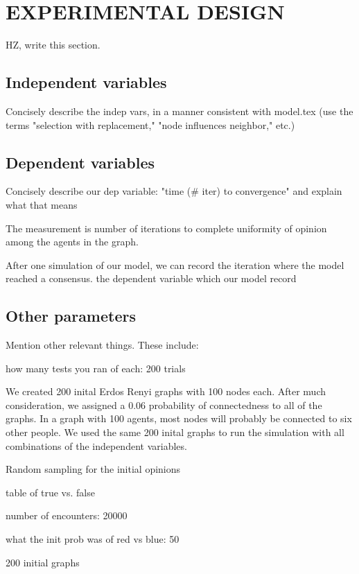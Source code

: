 
\section{EXPERIMENTAL DESIGN}

HZ, write this section.

\subsection{Independent variables}

Concisely describe the indep vars, in a manner consistent with model.tex (use
the terms "selection with replacement," "node influences neighbor," etc.)


\subsection{Dependent variables}

Concisely describe our dep variable: "time (# iter) to convergence" and
explain what that means

The measurement is number of iterations to complete uniformity of opinion
among the agents in the graph.


After one simulation of our model, we can record the iteration where the model
reached a consensus.
 the dependent variable which our model record

\subsection{Other parameters}

Mention other relevant things. These include:

how many tests you ran of each: 200 trials 

We created 200 inital Erdos Renyi graphs with 100 nodes each. After much consideration,
we assigned a 0.06 probability of connectedness to all of the graphs. In a graph
with 100 agents, most nodes will probably be connected to six other people. We 
used the same 200 inital graphs to run the simulation with all combinations of
the independent variables.

Random sampling for the initial opinions 


table of true vs. false

number of encounters: 20000

what the init prob was of red vs blue: 50%



200 initial graphs



